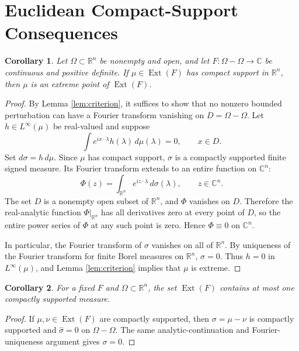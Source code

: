 \documentclass[11pt]{article}
\newtheorem{corollary}{Corollary}
\DeclareMathOperator{\Ext}{Ext}
\begin{document}
\section*{Euclidean Compact-Support Consequences}

\begin{corollary}
\label{thm:compact-extreme}
Let \(\Omega\subset\mathbb R^n\) be nonempty and open, and let \(F:\Omega-\Omega\to\mathbb C\) be continuous and positive definite. If \(\mu\in\Ext(F)\) has compact support in \(\mathbb R^n\), then \(\mu\) is an extreme point of \(\Ext(F)\).
\end{corollary}

\begin{proof}
By Lemma \ref{lem:criterion}, it suffices to show that no nonzero bounded perturbation can have a Fourier transform vanishing on \(D=\Omega-\Omega\). Let \(h\in L^\infty(\mu)\) be real-valued and suppose
\[
  \int e^{i x\cdot\lambda}h(\lambda)\,d\mu(\lambda)=0,
  \qquad x\in D.
\]
Set \(d\sigma=h\,d\mu\). Since \(\mu\) has compact support, \(\sigma\) is a compactly supported finite signed measure. Its Fourier transform extends to an entire function on \(\mathbb C^n\):
\[
  \Phi(z)=\int_{\mathbb R^n} e^{i z\cdot\lambda}\,d\sigma(\lambda),
  \qquad z\in\mathbb C^n.
\]
The set \(D\) is a nonempty open subset of \(\mathbb R^n\), and \(\Phi\) vanishes on \(D\). Therefore the real-analytic function \(\Phi|_{\mathbb R^n}\) has all derivatives zero at every point of \(D\), so the entire power series of \(\Phi\) at any such point is zero. Hence \(\Phi\equiv 0\) on \(\mathbb C^n\).

In particular, the Fourier transform of \(\sigma\) vanishes on all of \(\mathbb R^n\). By uniqueness of the Fourier transform for finite Borel measures on \(\mathbb R^n\), \(\sigma=0\). Thus \(h=0\) in \(L^\infty(\mu)\), and Lemma \ref{lem:criterion} implies that \(\mu\) is extreme.
\end{proof}

\begin{corollary}
For a fixed \(F\) and \(\Omega\subset\mathbb R^n\), the set \(\Ext(F)\) contains at most one compactly supported measure.
\end{corollary}

\begin{proof}
If \(\mu,\nu\in\Ext(F)\) are compactly supported, then \(\sigma=\mu-\nu\) is compactly supported and \(\widehat\sigma=0\) on \(\Omega-\Omega\). The same analytic-continuation and Fourier-uniqueness argument gives \(\sigma=0\).
\end{proof}
\end{document}
